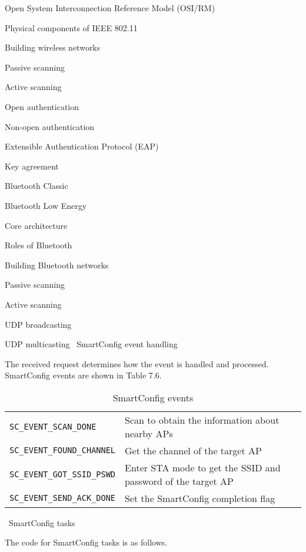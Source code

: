 \documentclass[a4paper,12pt]{book}
\begin{document}
\begin{term}{Open System Interconnection Reference Model (OSI/RM)}
\begin{term}{Physical components of IEEE 802.11}
\begin{term}{Building wireless networks}
\begin{term}{Passive scanning}
\begin{term}{Active scanning}
\begin{term}{Open authentication}
\begin{term}{Non-open authentication}
\begin{term}{Extensible Authentication Protocol (EAP)}
\begin{term}{Key agreement}
\begin{term}{Bluetooth Classic}
\begin{term}{Bluetooth Low Energy}
\begin{term}{Core architecture}
\begin{term}{Roles of Bluetooth}
\begin{term}{Building Bluetooth networks}
\begin{term}{Passive scanning}
\begin{term}{Active scanning}
\begin{term}{UDP broadcasting}
\begin{term}{UDP multicasting}
\textbullet\ SmartConfig event handling

The received request determines how the event is handled and processed. SmartConfig events are shown in Table 7.6.

\begin{table}[h!]
    \renewcommand{\arraystretch}{1.2}
    \caption{SmartConfig events}
    \begin{tabular}{|>{\small}m{}|>{\small}m{}|}
        \hline
        \rowcolor{LightBlue}\multicolumn{1}{|c|}{\textbf{Event}}&\multicolumn{1}{c|}{\textbf{Description}}\\
        \hline
        \verb|SC_EVENT_SCAN_DONE|&Scan to obtain the information about nearby APs\\
        \hline
        \verb|SC_EVENT_FOUND_CHANNEL|&Get the channel of the target AP\\
        \hline
        \verb|SC_EVENT_GOT_SSID_PSWD|&Enter STA mode to get the SSID and password of the target AP\\
        \hline
        \verb|SC_EVENT_SEND_ACK_DONE|&Set the SmartConfig completion flag\\
        \hline
    \end{tabular}
\end{table}

\textbullet\ SmartConfig tasks

The code for SmartConfig tasks is as follows.



\end{term}
\end{term}
\end{term}
\end{term}
\end{term}
\end{term}
\end{term}
\end{term}
\end{term}
\end{term}
\end{term}
\end{term}
\end{term}
\end{term}
\end{term}
\end{term}
\end{term}
\end{term}
\end{document}

